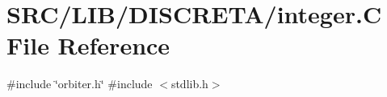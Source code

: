 \hypertarget{integer_8_c}{}\section{S\+R\+C/\+L\+I\+B/\+D\+I\+S\+C\+R\+E\+T\+A/integer.C File Reference}
\label{integer_8_c}
{\ttfamily \#include \char`\"{}orbiter.\+h\char`\"{}}\newline
{\ttfamily \#include $<$stdlib.\+h$>$}\newline

